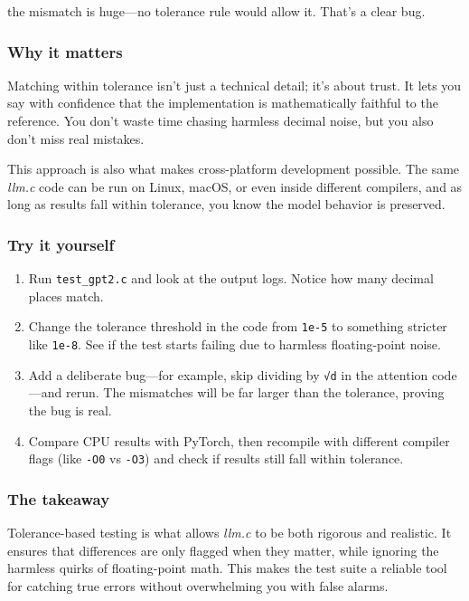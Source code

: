\documentclass[
  letterpaper,
  DIV=11,
  numbers=noendperiod]{scrreprt}
\providecommand{\tightlist}{%
  \setlength{\itemsep}{0pt}\setlength{\parskip}{0pt}}
\begin{document}
the mismatch is huge---no tolerance rule would allow it. That's a clear
bug.

\subsubsection{Why it matters}\label{why-it-matters-33}

Matching within tolerance isn't just a technical detail; it's about
trust. It lets you say with confidence that the implementation is
mathematically faithful to the reference. You don't waste time chasing
harmless decimal noise, but you also don't miss real mistakes.

This approach is also what makes cross-platform development possible.
The same \emph{llm.c} code can be run on Linux, macOS, or even inside
different compilers, and as long as results fall within tolerance, you
know the model behavior is preserved.

\subsubsection{Try it yourself}\label{try-it-yourself-41}

\begin{enumerate}
\def\labelenumi{\arabic{enumi}.}
\tightlist
\item
  Run \texttt{test\_gpt2.c} and look at the output logs. Notice how many
  decimal places match.
\item
  Change the tolerance threshold in the code from \texttt{1e-5} to
  something stricter like \texttt{1e-8}. See if the test starts failing
  due to harmless floating-point noise.
\item
  Add a deliberate bug---for example, skip dividing by \texttt{√d} in
  the attention code---and rerun. The mismatches will be far larger than
  the tolerance, proving the bug is real.
\item
  Compare CPU results with PyTorch, then recompile with different
  compiler flags (like \texttt{-O0} vs \texttt{-O3}) and check if
  results still fall within tolerance.
\end{enumerate}

\subsubsection{The takeaway}\label{the-takeaway-42}

Tolerance-based testing is what allows \emph{llm.c} to be both rigorous
and realistic. It ensures that differences are only flagged when they
matter, while ignoring the harmless quirks of floating-point math. This
makes the test suite a reliable tool for catching true errors without
overwhelming you with false alarms.
\end{document}
